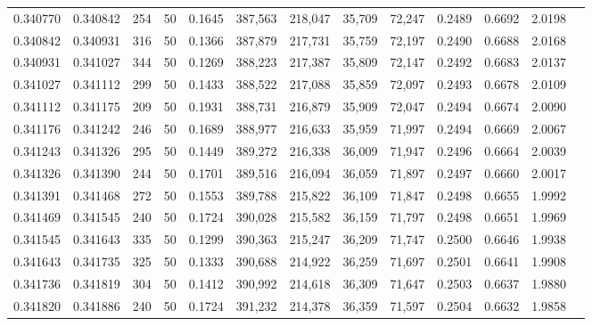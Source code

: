 \begin{tabular}{rrrrrrrrrrrrr}
0.340770 & 0.340842 &   254 &  50 &                                     0.1645 & 387,563 & 218,047 &  35,709 &  72,247 & 0.2489 & 0.6692 & 2.0198 \\
0.340842 & 0.340931 &   316 &  50 &                                     0.1366 & 387,879 & 217,731 &  35,759 &  72,197 & 0.2490 & 0.6688 & 2.0168 \\
0.340931 & 0.341027 &   344 &  50 &                                     0.1269 & 388,223 & 217,387 &  35,809 &  72,147 & 0.2492 & 0.6683 & 2.0137 \\
0.341027 & 0.341112 &   299 &  50 &                                     0.1433 & 388,522 & 217,088 &  35,859 &  72,097 & 0.2493 & 0.6678 & 2.0109 \\
0.341112 & 0.341175 &   209 &  50 &                                     0.1931 & 388,731 & 216,879 &  35,909 &  72,047 & 0.2494 & 0.6674 & 2.0090 \\
0.341176 & 0.341242 &   246 &  50 &                                     0.1689 & 388,977 & 216,633 &  35,959 &  71,997 & 0.2494 & 0.6669 & 2.0067 \\
0.341243 & 0.341326 &   295 &  50 &                                     0.1449 & 389,272 & 216,338 &  36,009 &  71,947 & 0.2496 & 0.6664 & 2.0039 \\
0.341326 & 0.341390 &   244 &  50 &                                     0.1701 & 389,516 & 216,094 &  36,059 &  71,897 & 0.2497 & 0.6660 & 2.0017 \\
0.341391 & 0.341468 &   272 &  50 &                                     0.1553 & 389,788 & 215,822 &  36,109 &  71,847 & 0.2498 & 0.6655 & 1.9992 \\
0.341469 & 0.341545 &   240 &  50 &                                     0.1724 & 390,028 & 215,582 &  36,159 &  71,797 & 0.2498 & 0.6651 & 1.9969 \\
0.341545 & 0.341643 &   335 &  50 &                                     0.1299 & 390,363 & 215,247 &  36,209 &  71,747 & 0.2500 & 0.6646 & 1.9938 \\
0.341643 & 0.341735 &   325 &  50 &                                     0.1333 & 390,688 & 214,922 &  36,259 &  71,697 & 0.2501 & 0.6641 & 1.9908 \\
0.341736 & 0.341819 &   304 &  50 &                                     0.1412 & 390,992 & 214,618 &  36,309 &  71,647 & 0.2503 & 0.6637 & 1.9880 \\
0.341820 & 0.341886 &   240 &  50 &                                     0.1724 & 391,232 & 214,378 &  36,359 &  71,597 & 0.2504 & 0.6632 & 1.9858 \\

\end{tabular}
